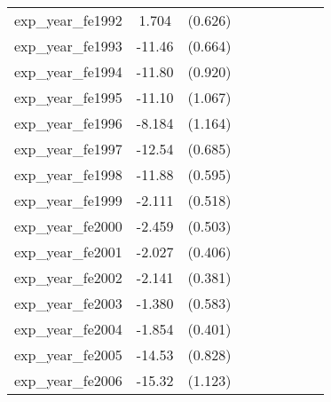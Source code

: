 {\begin{tabular}{l*{4}{cc}}
exp\_year\_fe1992&    1.704\sym{**} &  (0.626)&                  &         &                  &         &                  &         \\
exp\_year\_fe1993&   -11.46\sym{***}&  (0.664)&                  &         &                  &         &                  &         \\
exp\_year\_fe1994&   -11.80\sym{***}&  (0.920)&                  &         &                  &         &                  &         \\
exp\_year\_fe1995&   -11.10\sym{***}&  (1.067)&                  &         &                  &         &                  &         \\
exp\_year\_fe1996&   -8.184\sym{***}&  (1.164)&                  &         &                  &         &                  &         \\
exp\_year\_fe1997&   -12.54\sym{***}&  (0.685)&                  &         &                  &         &                  &         \\
exp\_year\_fe1998&   -11.88\sym{***}&  (0.595)&                  &         &                  &         &                  &         \\
exp\_year\_fe1999&   -2.111\sym{***}&  (0.518)&                  &         &                  &         &                  &         \\
exp\_year\_fe2000&   -2.459\sym{***}&  (0.503)&                  &         &                  &         &                  &         \\
exp\_year\_fe2001&   -2.027\sym{***}&  (0.406)&                  &         &                  &         &                  &         \\
exp\_year\_fe2002&   -2.141\sym{***}&  (0.381)&                  &         &                  &         &                  &         \\
exp\_year\_fe2003&   -1.380\sym{*}  &  (0.583)&                  &         &                  &         &                  &         \\
exp\_year\_fe2004&   -1.854\sym{***}&  (0.401)&                  &         &                  &         &                  &         \\
exp\_year\_fe2005&   -14.53\sym{***}&  (0.828)&                  &         &                  &         &                  &         \\
exp\_year\_fe2006&   -15.32\sym{***}&  (1.123)&                  &         &                  &         &                  &         \\

\end{tabular}}
